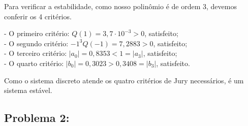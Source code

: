 Para verificar a estabilidade, como nosso polinômio é de ordem 3, devemos conferir os 4 critérios.

- O primeiro critério: $Q(1)= 3,7 \cdot 10^{-3} > 0$, satisfeito; \\
- O segundo critério: $-1^3 Q(-1) = 7,2883 > 0$, satisfeito;\\
- O terceiro critério: $|a_0| = 0,8353 < 1 = |a_3|$, satisfeito; \\
- O quarto critério: $|b_0| = 0,3023 > 0,3408 = |b_3| $, satisfeito. 

Como o sistema discreto atende os quatro critérios de Jury necessários, é um sistema estável.

\subsection*{Problema 2:}